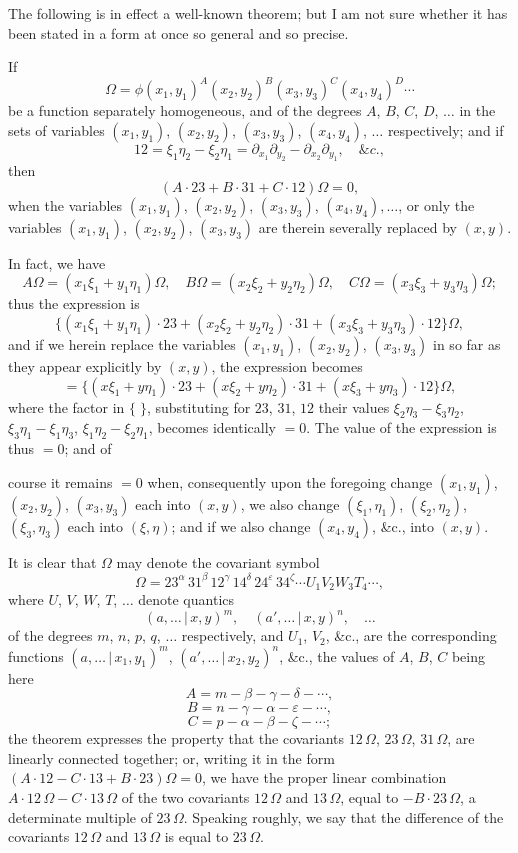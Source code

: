 \documentclass[11pt,a4paper]{article}
\providecommand{\dasv}{\,|\,}
\begin{document}
The following is in effect a well-known theorem; but I am not sure whether it has been stated in a form at once so general and so precise.

If
\[
\Omega = \phi(x_1, y_1)^A (x_2, y_2)^B (x_3, y_3)^C (x_4, y_4)^D \cdots
\]
be a function separately homogeneous, and of the degrees $A$, $B$, $C$, $D$, $\ldots$ in the sets of variables $(x_1, y_1)$, $(x_2, y_2)$, $(x_3, y_3)$, $(x_4, y_4)$, $\ldots$ respectively; and if
\[
12 = \xi_1 \eta_2 - \xi_2 \eta_1 = \partial_{x_1}\partial_{y_2} - \partial_{x_2}\partial_{y_1},\quad \&c.,
\]
then
\[
(A\cdot 23 + B\cdot 31 + C\cdot 12)\Omega = 0,
\]
when the variables $(x_1, y_1)$, $(x_2, y_2)$, $(x_3, y_3)$, $(x_4, y_4),\ldots$, or only the variables $(x_1, y_1)$, $(x_2, y_2)$, $(x_3, y_3)$ are therein severally replaced by $(x, y)$.

In fact, we have
\[
A\Omega = (x_1 \xi_1 + y_1 \eta_1)\Omega,\quad B\Omega = (x_2 \xi_2 + y_2 \eta_2)\Omega,\quad C\Omega = (x_3 \xi_3 + y_3 \eta_3)\Omega;
\]
thus the expression is
\[
\{(x_1 \xi_1 + y_1 \eta_1)\cdot 23 + (x_2 \xi_2 + y_2 \eta_2)\cdot 31 + (x_3 \xi_3 + y_3 \eta_3)\cdot 12\}\Omega,
\]
and if we herein replace the variables $(x_1, y_1)$, $(x_2, y_2)$, $(x_3, y_3)$ in so far as they appear explicitly by $(x, y)$, the expression becomes
\[
= \{(x\xi_1 + y\eta_1)\cdot 23 + (x\xi_2 + y\eta_2)\cdot 31 + (x\xi_3 + y\eta_3)\cdot 12\}\Omega,
\]
where the factor in $\{\;\}$, substituting for $23$, $31$, $12$ their values $\xi_2 \eta_3 - \xi_3 \eta_2$, $\xi_3 \eta_1 - \xi_1 \eta_3$, $\xi_1 \eta_2 - \xi_2 \eta_1$, becomes identically $= 0$. The value of the expression is thus $=0$; and of

course it remains $=0$ when, consequently upon the foregoing change $(x_1, y_1)$, $(x_2, y_2)$, $(x_3, y_3)$ each into $(x, y)$, we also change $(\xi_1, \eta_1)$, $(\xi_2, \eta_2)$, $(\xi_3, \eta_3)$ each into $(\xi, \eta)$; and if we also change $(x_4, y_4)$, \&c., into $(x, y)$.

It is clear that $\Omega$ may denote the covariant symbol
\[
\Omega = 23^{\alpha}\,31^{\beta}\,12^{\gamma}\,14^{\delta}\,24^{\varepsilon}\,34^{\zeta}\cdots U_1 V_2 W_3 T_4 \cdots,
\]
where $U$, $V$, $W$, $T$, $\ldots$ denote quantics
\[
(a,\ldots\!\dasv\! x, y)^m,\quad (a',\ldots\!\dasv\! x, y)^n,\quad \ldots
\]
of the degrees $m$, $n$, $p$, $q$, $\ldots$ respectively, and $U_1$, $V_2$, \&c., are the corresponding functions $(a, \ldots\!\dasv\! x_1, y_1)^m$, $(a', \ldots\!\dasv\! x_2, y_2)^n$, \&c., the values of $A$, $B$, $C$ being here
\[
A = m - \beta - \gamma - \delta - \cdots,
\]
\[
B = n - \gamma - \alpha - \varepsilon - \cdots,
\]
\[
C = p - \alpha - \beta - \zeta - \cdots;
\]
the theorem expresses the property that the covariants $12\,\Omega$, $23\,\Omega$, $31\,\Omega$, are linearly connected together; or, writing it in the form $(A\cdot 12 - C\cdot 13 + B\cdot 23)\Omega = 0$, we have the proper linear combination $A\cdot 12\,\Omega - C\cdot 13\,\Omega$ of the two covariants $12\,\Omega$ and $13\,\Omega$, equal to $- B\cdot 23\,\Omega$, a determinate multiple of $23\,\Omega$. Speaking roughly, we say that the difference of the covariants $12\,\Omega$ and $13\,\Omega$ is equal to $23\,\Omega$.
\end{document}
